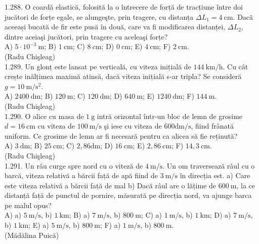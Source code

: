 1.288. O coardă elastică, folosită la o întrecere de forță de tracțiune între doi jucători de forțe egale, se alungeşte, prin tragere, cu distanța $\Delta L_{1}=4 \mathrm{~cm}$. Dacã aceeași bucată de fir este pusă în două, care va fi modificarea distanței, $\Delta L_{2}$, dintre aceiaşi jucători, prin tragere cu aceleaşi forțe?\\ A) $5 \cdot 10^{-3} \mathrm{~m}$; B) $1 \mathrm{~cm}$; C) $8 \mathrm{~cm}$; D) $0 \mathrm{~cm}$; E) $4 \mathrm{~cm}$; F) $2 \mathrm{~cm}$.\\ (Radu Chişleag)\\

1.289. Un glonț este lansat pe verticală, cu viteza inițială de $144 \mathrm{~km} / \mathrm{h}$. Cu cât crește inălțimea maximă atinsă, dacă viteza inițială s-ar tripla? Se consideră $g=10 \mathrm{~m} / \mathrm{s}^{2}$.\\ A) $2400 \mathrm{~dm}$; B) $120 \mathrm{~m}$; C) $120 \mathrm{~dm}$; D) $640 \mathrm{~m}$; E) $1240 \mathrm{~dm}$; F) $144 \mathrm{~m}$.\\ (Radu Chişleag)\\

1.290. O alice cu masa de $1 \mathrm{~g}$ intră orizontal într-un bloc de lemn de grosime $d=16 \mathrm{~cm}$ cu viteza de $100 \mathrm{~m} / \mathrm{s}$ şi iese cu viteza de $600 \mathrm{dm} / \mathrm{s}$, fiind frânată uniform. Ce grosime de lemn ar fi necesară pentru ca alicea să fie reținută?\\ A) $3 \mathrm{~dm}$; B) $25 \mathrm{~cm}$; C) $2,86 \mathrm{dm}$; D) $16 \mathrm{~cm}$; E) $2,86 \mathrm{~cm}$; F) $14,3 \mathrm{~cm}$.\\ (Radu Chişleag)\\

1.291. Un râu curge spre nord cu o viteză de $4 \mathrm{~m} / \mathrm{s}$. Un om traversează râul cu o barcă, viteza relativă a bărcii față de apă fiind de $3 \mathrm{~m} / \mathrm{s}$ în direcția est. a) Care este viteza relativă a bărcii față de mal b) Dacă râul are o lățime de $600 \mathrm{~m}$, la ce distanță față de punctul de pornire, măsurată pe direcția nord, va ajunge barca pe malul opus?\\ A) a) $5 \mathrm{~m} / \mathrm{s}$, b) $1 \mathrm{~km}$; B) a) $7 \mathrm{~m} / \mathrm{s}$, b) $800 \mathrm{~m}$; C) a) $1 \mathrm{~m} / \mathrm{s}$, b) $1 \mathrm{~km}$; D) a) $7 \mathrm{~m} / \mathrm{s}$, b) $1 \mathrm{~km}$; E) a) $5 \mathrm{~m} / \mathrm{s}$, b) $800 \mathrm{~m}$; F) a) $1 \mathrm{~m} / \mathrm{s}$, b) $800 \mathrm{~m}$.\\ (Mădălina Puică)\\

